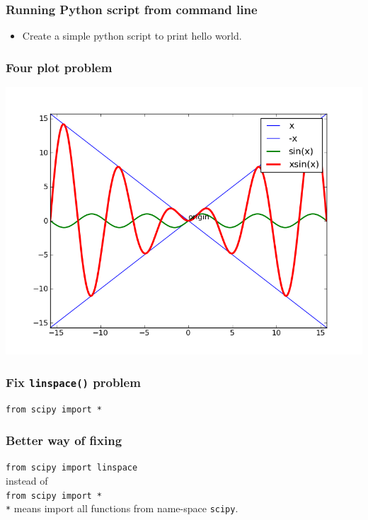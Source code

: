 \documentclass[17pt]{beamer}
\begin{document}
\begin{frame}[fragile]
\frametitle{Running Python script from command line}
\label{sec-4}

\begin{itemize}
\item Create a simple python script to print hello world. 
\end{itemize}
\end{frame}
\begin{frame}
\frametitle{Four plot problem}
\label{sec-6}

    \begin{center}
      \includegraphics[scale=0.4]{four_plot}    
    \end{center}
\end{frame}
\begin{frame}[fragile]
\frametitle{Fix \texttt{linspace()} problem}
\label{sec-7}

\texttt{from scipy import *}
\end{frame}
\begin{frame}[fragile]
\frametitle{Better way of fixing}
\label{sec-9}

\texttt{from scipy import linspace}\\\pause
\vspace{5pt}
  instead of\\\pause
\vspace{5pt}
\texttt{from scipy import *}\\\pause
\vspace{5pt}
\texttt{*} means import all functions from name-space \texttt{scipy}.
\end{frame}
\end{document}
